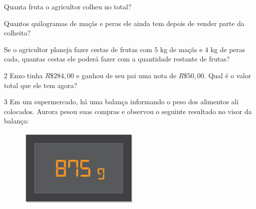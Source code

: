 \begin{escolha}
\item Quanta fruta o agricultor colheu no total?





\item Quantos quilogramas de maçãs e peras ele ainda tem depois de vender parte da colheita?





\item Se o agricultor planeja fazer cestas de frutas com $5$ kg de maçãs e $4$ kg de peras cada,
quantas cestas ele poderá fazer com a quantidade restante de frutas?






\end{escolha}

\num{2}  Enzo tinha $R\$284,00$ e ganhou de seu pai uma nota de $R\$50,00$. Qual é
o valor total que ele tem agora?


\num{3}  Em um supermercado, há uma balança informando o peso dos alimentos
ali colocados. Aurora pesou suas compras e observou o seguinte resultado
no visor da balança:

\begin{figure}
\centering\includegraphics[width=2.33333in,height=1.53125in]{./imgSAEB_6_MAT/media/image23.png}
\end{figure}

